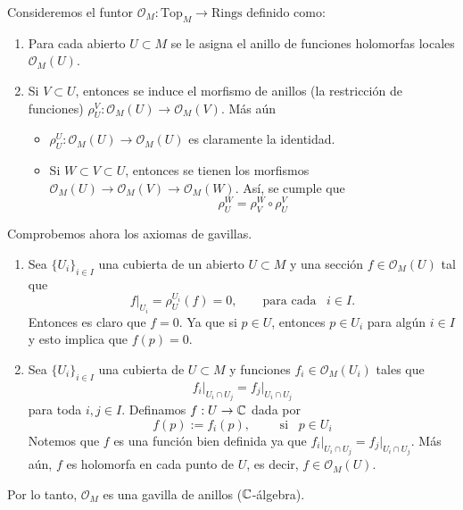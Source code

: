 \begin{example}
	Consideremos el funtor $\mathscr{O}_M:\mathrm{Top}_M\to \mathrm{Rings}$ definido como:
	\begin{enumerate}
		\item Para cada abierto $U\subset M$ se le asigna el anillo de funciones holomorfas locales $\mathscr{O}_M(U)$.
		\item Si $V\subset U$, entonces se induce el morfismo de anillos (la restricción de funciones) $\rho_U^V:\mathscr{O}_M(U)\to\mathscr{O}_M(V)$. Más aún
		\begin{itemize}
			\item $\rho_U^U:\mathscr{O}_M(U)\to\mathscr{O}_M(U)$ es claramente la identidad.
			\item Si $W\subset V\subset U$, entonces se tienen los morfismos $\mathscr{O}_M(U)\to \mathscr{O}_M(V)\to\mathscr{O}_M(W)$. Así, se cumple que 
			$$\rho_U^W=\rho_V^W\circ\rho_U^V $$
		\end{itemize}
	\end{enumerate}
	Comprobemos ahora los axiomas de gavillas.
	\begin{enumerate}
		\item Sea $\{U_i\}_{i\in I}$ una cubierta de un abierto $U\subset M$ y una sección $f\in\mathscr{O}_M(U)$ tal que
		\begin{equation*}
			f\left.\right|_{U_i}=\rho_U^{U_i}(f)=0,\qquad \text{para cada }\enspace i\in I.
		\end{equation*}
		Entonces es claro que $f=0$. Ya que si $p\in U$, entonces $p\in U_i$ para algún $i\in I$ y esto implica que $f(p)=0$.
		\item Sea $\{U_i\}_{i\in I}$ una cubierta de $U\subset M$ y funciones $f_i\in \mathscr{O}_M(U_i)$ tales que
		\begin{equation*}
			f_i\left.\right|_{U_i\cap U_j}=f_j\left.\right|_{U_i\cap U_j}
		\end{equation*}
		para toda $i,j\in I$. Definamos $f:U\to\mathbb{C}$ dada por
		\begin{equation*}
			f(p):=f_i(p),\qquad \text{ si }\enspace p\in U_i
		\end{equation*}
		Notemos que $f$ es una función bien definida ya que $f_i\left.\right|_{U_i\cap U_j}=f_j\left.\right|_{U_i\cap U_j}$. Más aún, $f$ es holomorfa en cada punto de $U$, es decir, $f\in\mathscr{O}_M(U)$.
	\end{enumerate}
	Por lo tanto, $\mathscr{O}_M$ es una gavilla de anillos ($\mathbb{C}$-álgebra).
\end{example}

